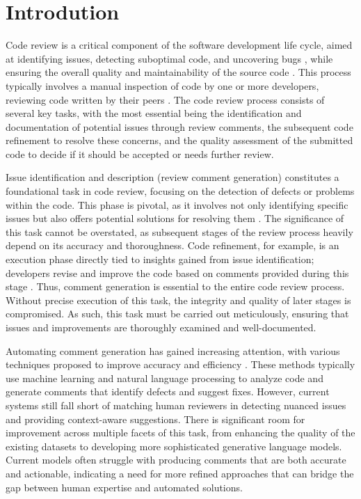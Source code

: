 \section{Introdution}
\label{sec:intro}

Code review is a critical component of the software development life cycle, aimed at identifying issues, detecting suboptimal code, and uncovering bugs \cite{mcintosh2014impact, mcintosh2016empirical}, while ensuring the overall quality and maintainability of the source code \cite{ackerman1989software, ackerman1984software, morales2015code}. This process typically involves a manual inspection of code by one or more developers, reviewing code written by their peers \cite{fagan2002design, bavota2015four}. The code review process consists of several key tasks, with the most essential being the identification and documentation of potential issues through review comments, the subsequent code refinement to resolve these concerns, and the quality assessment of the submitted code to decide if it should be accepted or needs further review.

Issue identification and description (\ie review comment generation) constitutes a foundational task in code review, focusing on the detection of defects or problems within the code. This phase is pivotal, as it involves not only identifying specific issues but also offers potential solutions for resolving them \cite{mcintosh2014impact, mcintosh2016empirical}. The significance of this task cannot be overstated, as subsequent stages of the review process heavily depend on its accuracy and thoroughness. Code refinement, for example, is an execution phase directly tied to insights gained from issue identification; developers revise and improve the code based on comments provided during this stage \cite{bacchelli2013expectations}. Thus, comment generation is essential to the entire code review process. Without precise execution of this task, the integrity and quality of later stages is compromised. As such, this task must be carried out meticulously, ensuring that issues and improvements are thoroughly examined and well-documented.






Automating comment generation has gained increasing attention, with various techniques proposed to improve accuracy and efficiency \cite{tufan2021towards, tufano2022using, li2022automating, li2022auger, ben2024improving}.
These methods typically use machine learning and natural language processing to analyze code and generate comments that identify defects and suggest fixes.
However, current systems still fall short of matching human reviewers in detecting nuanced issues and providing context-aware suggestions.
There is significant room for improvement across multiple facets of this task, from enhancing the quality of the existing datasets to developing more sophisticated generative language models.
Current models often struggle with producing comments that are both accurate and actionable, indicating a need for more refined approaches that can bridge the gap between human expertise and automated solutions.

